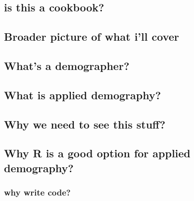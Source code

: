 \documentclass[
  letterpaper,
  DIV=11,
  numbers=noendperiod]{scrreprt}
\begin{document}
\hypertarget{is-this-a-cookbook}{%
\subsection*{is this a cookbook?}\label{is-this-a-cookbook}}

\hypertarget{broader-picture-of-what-ill-cover}{%
\subsection*{Broader picture of what i'll
cover}\label{broader-picture-of-what-ill-cover}}

\hypertarget{whats-a-demographer}{%
\subsection*{What's a demographer?}\label{whats-a-demographer}}

\hypertarget{what-is-applied-demography}{%
\subsection*{What is applied
demography?}\label{what-is-applied-demography}}

\hypertarget{why-we-need-to-see-this-stuff}{%
\subsection*{Why we need to see this
stuff?}\label{why-we-need-to-see-this-stuff}}

\hypertarget{why-r-is-a-good-option-for-applied-demography}{%
\subsection*{Why R is a good option for applied
demography?}\label{why-r-is-a-good-option-for-applied-demography}}

\hypertarget{why-write-code}{%
\subsubsection*{why write code?}\label{why-write-code}}
\end{document}
